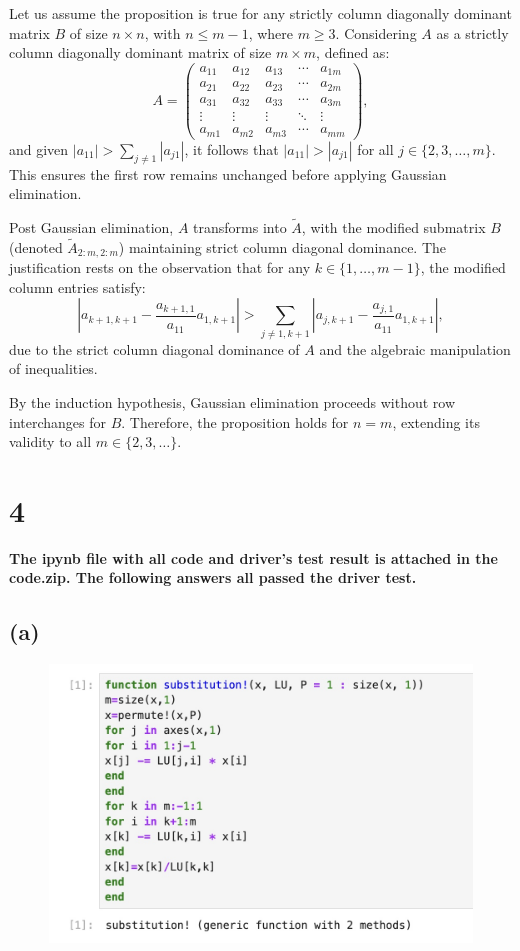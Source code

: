 \documentclass{article}
\begin{document}
Let us assume the proposition is true for any strictly column diagonally dominant matrix \(B\) of size \(n \times n\), with \(n \leq m-1\), where \(m \geq 3\). Considering \(A\) as a strictly column diagonally dominant matrix of size \(m \times m\), defined as:
\[
A = \begin{pmatrix}
a_{11} & a_{12} & a_{13} & \cdots & a_{1m} \\
a_{21} & a_{22} & a_{23} & \cdots & a_{2m} \\
a_{31} & a_{32} & a_{33} & \cdots & a_{3m} \\
\vdots & \vdots & \vdots & \ddots & \vdots \\
a_{m1} & a_{m2} & a_{m3} & \cdots & a_{mm}
\end{pmatrix},
\]
and given \(|a_{11}| > \sum_{j \neq 1} |a_{j1}|\), it follows that \(|a_{11}| > |a_{j1}|\) for all \(j \in \{2, 3, \ldots, m\}\). This ensures the first row remains unchanged before applying Gaussian elimination.

Post Gaussian elimination, \(A\) transforms into \(\widetilde{A}\), with the modified submatrix \(B\) (denoted \(\widetilde{A}_{2:m, 2:m}\)) maintaining strict column diagonal dominance. The justification rests on the observation that for any \(k \in \{1, \ldots, m-1\}\), the modified column entries satisfy:
\[
\left| a_{k+1, k+1} - \frac{a_{k+1,1}}{a_{11}} a_{1, k+1} \right| > \sum_{j \neq 1, k+1} \left| a_{j, k+1} - \frac{a_{j,1}}{a_{11}} a_{1, k+1} \right|,
\]
due to the strict column diagonal dominance of \(A\) and the algebraic manipulation of inequalities.

By the induction hypothesis, Gaussian elimination proceeds without row interchanges for \(B\). Therefore, the proposition holds for \(n=m\), extending its validity to all \(m \in \{2,3, \ldots\}\).
\section{4}
\textbf{The ipynb file with all code and driver's test result is attached in the code.zip. The following answers all passed the driver test.}
\subsection{(a)}
\begin{figure}[H]

    \includegraphics[width=0.75\linewidth]{Image 2-20-24 at 07.10.jpeg}
    \end{figure}
\end{document}
